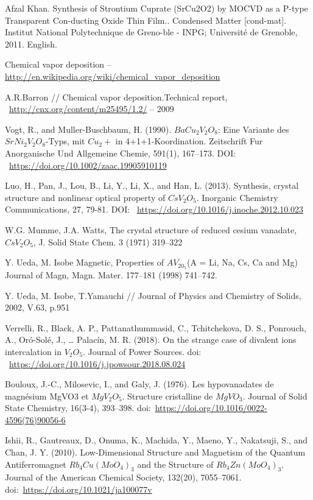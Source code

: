 \documentclass[11pt]{article}
\begin{document}
\begin{thebibliography}{3}
Afzal Khan. Synthesis of Strontium Cuprate (SrCu2O2) by MOCVD as a P-type Transparent Con-ducting Oxide Thin Film.. Condensed Matter [cond-mat]. Institut National Polytechnique de Greno-ble - INPG; Université de Grenoble, 2011. English.

Chemical vapor deposition -- ~\url{ http://en.wikipedia.org/wiki/chemical_vapor_deposition}

A.R.Barron // Chemical   vapor   deposition.Technical   report, ~\url{http://cnx.org/content/m25495/1.2/} -- 2009

Vogt, R., and Muller-Buschbaum, H. (1990). $BaCu_2V_2O_8$: Eine Variante des $SrNi_2V_2O_8$-Typs, mit $Cu_2+$ in 4+1+1-Koordination. Zeitschrift Fur Anorganische Und Allgemeine Chemie, 591(1), 167–173. DOI: ~\url{https://doi.org/10.1002/zaac.19905910119}

Luo, H., Pan, J., Lou, B., Li, Y., Li, X., and Han, L. (2013). Synthesis, crystal structure and nonlinear optical property of $CsV_2O_5$. Inorganic Chemistry Communications, 27, 79-81. DOI: ~\url{https://doi.org/10.1016/j.inoche.2012.10.023} 

W.G. Mumme, J.A. Watts, The crystal structure of reduced cesium vanadate,$CsV_2O_5$, J. Solid State Chem. 3 (1971) 319–322

Y. Ueda, M. Isobe Magnetic, Properties of $AV_20_5$(A = Li, Na, Cs, Ca and Mg) Journal of Magn, Magn. Mater. 177–181 (1998) 741–742.

Y. Ueda, M. Isobe, T.Yamauchi // Journal of Physics and Chemistry of Solids, 2002, V.63, p.951


Verrelli, R., Black, A. P., Pattanathummasid, C., Tchitchekova, D. S., Ponrouch, A., Oró-Solé, J., … Palacín, M. R. (2018). On the strange case of divalent ions intercalation in $V_2O_5$. Journal of Power Sources. doi: ~\url{https://doi.org/10.1016/j.jpowsour.2018.08.024} 

Bouloux, J.-C., Milosevic, I., and Galy, J. (1976). Les hypovanadates de magnésium MgVO3 et $MgV_2O_5$. Structure cristalline de $MgVO_3$. Journal of Solid State Chemistry, 16(3-4), 393–398. doi:~\url{https://doi.org/10.1016/0022-4596(76)90056-6} 

Ishii, R., Gautreaux, D., Onuma, K., Machida, Y., Maeno, Y., Nakatsuji, S., and Chan, J. Y. (2010). Low-Dimensional Structure and Magnetism of the Quantum Antiferromagnet $Rb_4Cu(MoO_4)_3$ and the Structure of $Rb_4Zn(MoO_4)_3$. Journal of the American Chemical Society, 132(20), 7055–7061. doi:~\url{https://doi.org/10.1021/ja100077v }


\end{thebibliography}
\end{document}
